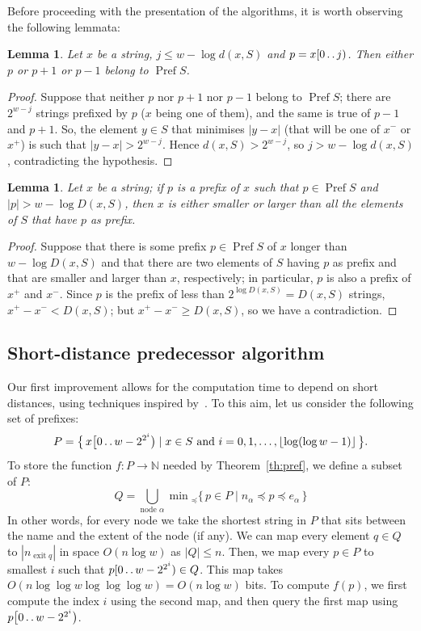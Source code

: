 \documentclass[a4paper,11pt]{article}
\newtheorem{lemma}[theorem]{Lemma}
\newcommand{\N}{\mathbb{N}}
\newcommand{\?}{\mskip1.5mu}
\def\..{\,\mathpunct{\ldotp\ldotp}} %
\DeclareMathOperator{\exit}{exit}
\DeclareMathOperator{\Pref}{Pref}
\begin{document}
Before proceeding with the presentation of the algorithms, it is worth observing
the following lemmata:
\begin{lemma}
\label{lemma:hitpref}
	Let $x$ be a string, $j \leq w-\log d(x,S)$ and $p=x[0\..j)$. Then either $p$
	or $p+1$ or $p-1$ belong to $\Pref S$. 
\end{lemma}
\begin{proof}
Suppose that neither $p$ nor $p+1$ nor $p-1$ belong to $\Pref S$; there are
$2^{w-j}$ strings prefixed by $p$ ($x$ being one of them), and the same is true
of $p-1$ and $p+1$. So, the element $y \in S$ that minimises $|y-x|$ (that will be one
of $x^-$ or $x^+$) is such that $|y-x|>2^{w-j}$. Hence $d(x,S)>2^{w-j}$, so
$j>w-\log d(x,S)$, contradicting the hypothesis.
\end{proof}
\begin{lemma}
\label{lemma:shortinprefs}
	Let $x$ be a string; if $p$ is a prefix of $x$ such that $p \in \Pref S$ and
	$|p|>w-\log D(x,S)$, then $x$ is either smaller or larger than all the
	elements of $S$ that have $p$ as prefix.
\end{lemma}
\begin{proof}
Suppose that there is some prefix $p\in \Pref S$ of $x$ longer than $w-\log
D(x,S)$ and that there are two elements of $S$ having $p$ as prefix and that
are smaller and larger than $x$, respectively; in particular, $p$ is also a
prefix of $x^+$ and $x^-$. Since $p$ is the prefix of less than $2^{\log D(x,S)}=D(x,S)$ strings, $x^+-x^-<D(x,S)$; but $x^+-x^-\geq D(x,S)$, so we have a contradiction.
\end{proof}

\subsection{Short-distance predecessor algorithm}

Our first improvement allows for the computation time to depend on short
distances, using techniques inspired by~\cite{BoseDoDuHoMo13}. To this aim, let us
consider the following set of prefixes:
\[
	P=\bigl\{\,x\bigl[0\..w-2^{2^i}\bigr) \mid x \in  S \text{ and }
	i=0,1,\dots,\lfloor\log(\log w - 1)\rfloor\,\bigr\}.
\]
To store the function $f:P\to \N$ needed by Theorem~\ref{th:pref}, we define a subset of $P$:
\[
Q=\bigcup_{\text{node $\alpha$}}\min{}_\preceq\{\,p\in P\mid n_\alpha\preceq p\preceq e_\alpha\,\}
\]
In other words, for every node we take the shortest string in $P$ that sits between the name and the extent
of the node (if any). We can map every element $q\in Q$ to $|n_{\exit q}|$ in space $O(n\log w)$ as $|Q|\leq n$.
Then, we map every $p\in P$ to smallest $i$ such that $p[0\..w-2^{2^i})\in Q$.
This map takes $O(n\log\log w\log\log\log w)=O(n\log w)$ bits. To compute $f(p)$, we first compute the index $i$ using 
the second map, and then query the first map using $p\bigl[0\..w-2^{2^i}\bigr)$. 
\end{document}
